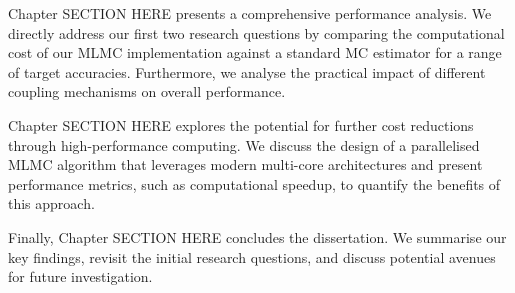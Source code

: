 Chapter SECTION HERE presents a comprehensive performance analysis. 
We directly address our first two research questions by comparing the 
computational cost of our MLMC implementation against a standard MC 
estimator for a range of target accuracies. Furthermore, we analyse 
the practical impact of different coupling mechanisms on overall performance.

Chapter SECTION HERE explores the potential for further cost reductions 
through high-performance computing. We discuss the design of a parallelised MLMC 
algorithm that leverages modern multi-core architectures and present performance 
metrics, such as computational speedup, to quantify the benefits of this approach.

Finally, Chapter SECTION HERE concludes the dissertation. 
We summarise our key findings, 
revisit the initial research questions, and discuss potential avenues for 
future investigation.



 
